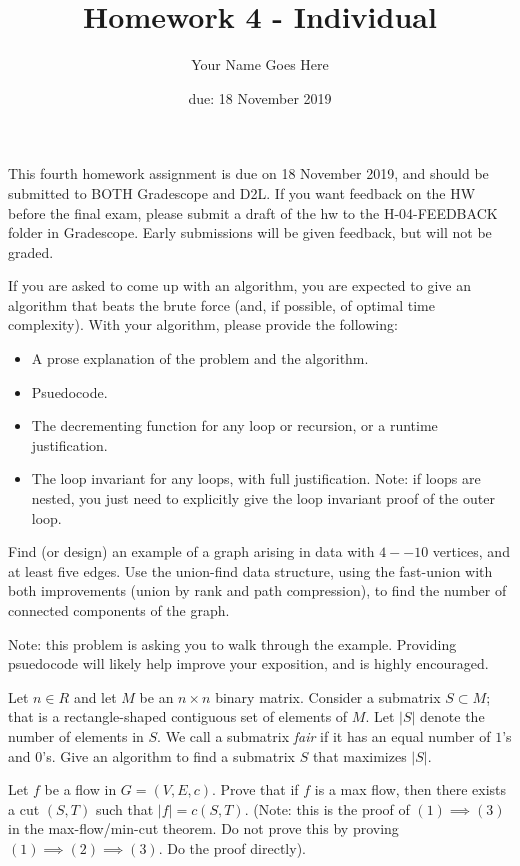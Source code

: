 \documentclass{article}
\author{Your Name Goes Here}
\date{due: 18 November 2019}
\title{Homework 4 - Individual}
\begin{document}
\maketitle

This fourth homework assignment is due on 18 November 2019, and should be
submitted to BOTH Gradescope and D2L.  If you want feedback on the HW before the
final exam, please submit a draft of the hw to the H-04-FEEDBACK folder in
Gradescope.  Early submissions will be given feedback, but will not be graded.

If you are asked to come up with an algorithm, you are expected to give an
algorithm that beats the brute force (and, if possible, of optimal time
complexity).
With your algorithm, please provide the following:
\begin{itemize}
    \item A prose explanation of the problem and the algorithm.
    \item Psuedocode.
    \item The decrementing function for any loop or recursion, or a runtime
        justification.
    \item The loop invariant for any loops, with full justification.  Note: if
        loops are nested, you just need to explicitly give the loop invariant
        proof of the outer loop.
\end{itemize}

\nextprob
Find (or design) an example of a graph arising in data
with $4--10$ vertices, and at least five
edges.  Use the union-find data structure, using the fast-union with both
improvements (union by rank and path compression), to find the number of
connected components of the graph.

Note: this problem is asking you to walk through the example.  Providing
psuedocode will likely help improve your exposition, and is highly encouraged.

\nextprob
Let $n \in R$ and let $M$ be an $n \times n$ binary matrix.  Consider a
submatrix $S \subset M$; that is a rectangle-shaped contiguous set of
elements of $M$.  Let $|S|$ denote the number of elements in $S$.  We call a
submatrix \emph{fair} if it has an equal number of $1$'s and $0$'s.  Give an
algorithm to find a submatrix $S$ that maximizes $|S|$.

\nextprob
Let $f$ be a flow in $G=(V,E,c)$.  Prove that if $f$ is a max flow, then there
exists a cut $(S,T)$ such that $|f| = c(S,T)$.  (Note: this is the proof of $(1)
\implies (3)$ in the max-flow/min-cut theorem.  Do not prove this by proving
$(1) \implies (2) \implies (3)$.  Do the proof directly).
\end{document}
